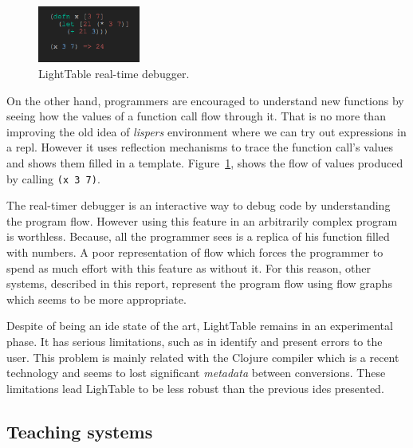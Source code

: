 \begin{figure}
  \vspace{-25pt}
  \begin{center}
    \includegraphics[width=0.3\textwidth]{img/eval-close}
  \end{center}
  \vspace{-20pt}
 \caption{LightTable real-time debugger.}  
  \vspace{-20pt}
    \label{fig:lt2}
\end{figure}

On the other hand, programmers are encouraged to understand new functions by seeing how the values of a function call flow through it. That is no more than improving the old idea of \textit{lispers} environment where we can try out expressions in a \ac{repl}. However it uses reflection mechanisms to trace the function call's values and shows them filled in a template. Figure~\ref{fig:lt2}, shows the flow of values produced by calling \texttt{(x 3 7)}.

The real-timer debugger is an interactive way to debug code by understanding the program flow. However using this feature in an arbitrarily complex program is worthless. Because, all the programmer sees is a replica of his function filled with numbers. A poor representation of flow which forces the programmer to spend as much effort with this feature as without it. For this reason, other systems, described in this report, represent the program flow using flow graphs which seems to be more appropriate.

Despite of being an \ac{ide} state of the art, LightTable remains in an experimental phase. It has serious limitations, such as in identify and present errors to the user. This problem is mainly related with the Clojure compiler which is a recent technology and seems to lost significant \textit{metadata} between conversions. These limitations lead LighTable to be less robust than the previous \ac{ide}s presented.
\subsection{Teaching systems}

